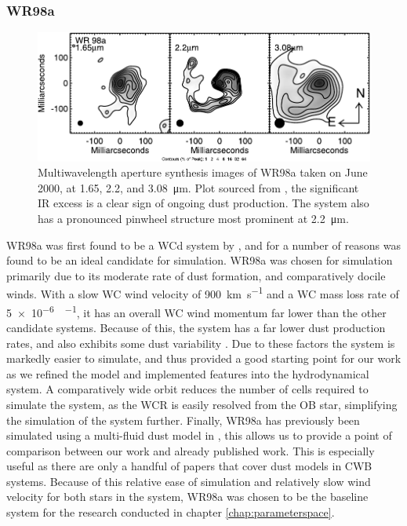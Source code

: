 \subsubsection{WR98a}

\begin{figure}[h]
  \centering
  \includegraphics{assets/systems/wr98a-monnier2007.pdf}
  \caption[\textit{Multiwavelength image of WR98a \parencite{monnierKeckAperturemaskingExperiment2007}}]{Multiwavelength aperture synthesis images of WR98a taken on June  2000, at 1.65, 2.2, and \SI{3.08}{\micro\metre}. Plot sourced from \textcite{monnierKeckAperturemaskingExperiment2007}, the significant IR excess is a clear sign of ongoing dust production. The system also has a pronounced pinwheel structure most prominent at \SI{2.2}{\micro\metre}.}
\end{figure}


WR98a was first found to be a WCd system by \textcite{monnierPinwheelNebulaWR1999}, and for a number of reasons was found to be an ideal candidate for simulation.
WR98a was chosen for simulation primarily due to its moderate rate of dust formation, and comparatively docile winds.
With a slow WC wind velocity of \SI{900}{\kilo\metre\per\second} and a WC mass loss rate of \SI{5e-6}{\solarmass\per\year}, it has an overall WC wind momentum far lower than the other candidate systems.
Because of this, the system has a far lower dust production rates, and also exhibits some dust variability \parencite{lauRevisitingImpactDust2020}.
Due to these factors the system is markedly easier to simulate, and thus provided a good starting point for our work as we refined the model and implemented features into the hydrodynamical system.
A comparatively wide orbit reduces the number of cells required to simulate the system, as the WCR is easily resolved from the OB star, simplifying the simulation of the system further.
Finally, WR98a has previously been simulated using a multi-fluid dust model in \textcite{hendrix_pinwheels_2016}, this allows us to provide a point of comparison between our work and already published work.
This is especially useful as there are only a handful of papers that cover dust models in CWB systems.
Because of this relative ease of simulation and relatively slow wind velocity for both stars in the system, WR98a was chosen to be the baseline system for the research conducted in chapter \ref{chap:parameterspace}.

